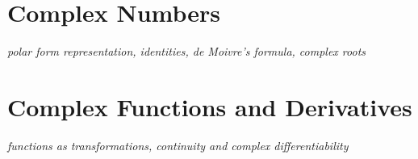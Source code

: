 \documentclass[../../../main.tex]{subfiles}
\begin{document}

\printbibliography[
    heading=subbibintoc,
    title={References}
]

\section{Complex Numbers}
\textit{polar form representation, identities, de Moivre's formula, complex roots}

\section{Complex Functions and Derivatives}
\textit{functions as transformations, continuity and complex differentiability}
\end{document}
